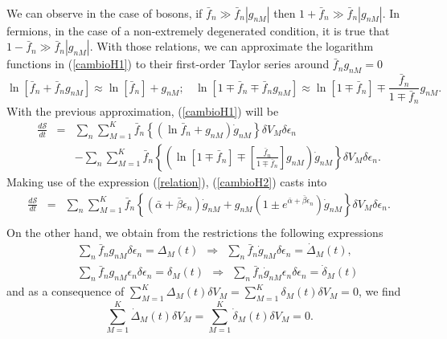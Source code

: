 \documentclass{article}
\newcommand{\de}{\delta}
\newcommand{\Ss}{\mathcal{S}}
\begin{document}
\\
We can observe in the case of bosons, if $\bar{f}_n \gg \bar{f}_n |g_{nM}|$ then $1+\bar{f}_n \gg \bar{f}_n |g_{nM}|$. In fermions, in the case of a non-extremely degenerated condition, it is true that $1-\bar{f}_n \gg \bar{f}_n |g_{nM}|$. With those relations, we can approximate the logarithm functions in (\ref{cambioH1}) to their first-order Taylor series around $\bar f_n g_{nM}=0$ 
\begin{equation}
    \ln [\bar{f}_n+\bar{f}_n g_{nM}] \approx \ln [\bar{f}_n]+ g_{nM}; \ \ \ \ \ln[1\mp\bar{f}_n\mp\bar{f}_n g_{nM}] \approx \ln[1\mp\bar{f}_n]\mp\frac{\bar{f}_n}{1\mp\bar{f}_{n}} g_{nM}. \label{lnapproximation}
\end{equation}{}
With the previous approximation, (\ref{cambioH1}) will be
\begin{eqnarray}
    \frac{d\Ss}{dt}&=&\sum_n \sum_{M=1}^{K} \bar{f}_n\left \{ (\ln \bar{f}_n+ g_{nM})\dot{g}_{nM}\right\} \de V_M \delta \epsilon_n \nonumber \\
    &&-\sum_{n}\sum_{M=1}^{K}\bar f_n\left\{ \left( \ln[1\mp\bar{f}_n]\mp \left[\frac{\bar{f}_n}{1\mp\bar{f}_n} \right] g_{nM}\right)\dot{g}_{nM} \right \}\de V_M \delta \epsilon_n.\label{cambioH2}
\end{eqnarray}{}
Making use of the expression (\ref{relation}),
(\ref{cambioH2}) casts into
\begin{eqnarray}
    \frac{d\Ss}{dt}&=&\sum_n \sum_{M=1}^{K} \bar{f}_n\left \{ (\bar{\alpha}+\bar{\beta}{\epsilon}_n)\dot{g}_{nM}+ g_{nM}\left(1\pm e^{\bar{\alpha}+\bar{\beta}{\epsilon}_n}\right)\dot{g}_{nM} \right \} \de V_M \delta \epsilon_n. \nonumber \\
    \label{cambioH3}
\end{eqnarray}{}
On the other hand, we obtain from the restrictions the following expressions
\begin{eqnarray}
    &&\sum_n \bar{f}_n g_{nM} \delta \epsilon_n=\Delta_M(t) \ \  \Rightarrow \ \  \sum_n \bar{f}_n \dot{g}_{nM} \delta \epsilon_n=\dot{\Delta}_M(t), \nonumber \\
    &&\sum_n  \bar{f}_n g_{nM}\epsilon_n \delta \epsilon_n=\delta_M(t) \ \  \Rightarrow \ \  \sum_n \bar{f}_n \dot{g}_{nM}\epsilon_n \delta \epsilon_n=\dot{\delta}_M(t)
\end{eqnarray}{}
and as a consequence of $\sum_{M=1}^{K} \Delta_M(t) \de V_M  =\sum_{M=1}^{K} \delta_M(t) \de V_M =0$, we find
\begin{equation}
    \sum_{M=1}^{K} \dot{\Delta}_M(t) \de V_M =\sum_{M=1}^{K} \dot{\delta}_{M}(t) \de V_M=0.
\end{equation}{}
\end{document}
